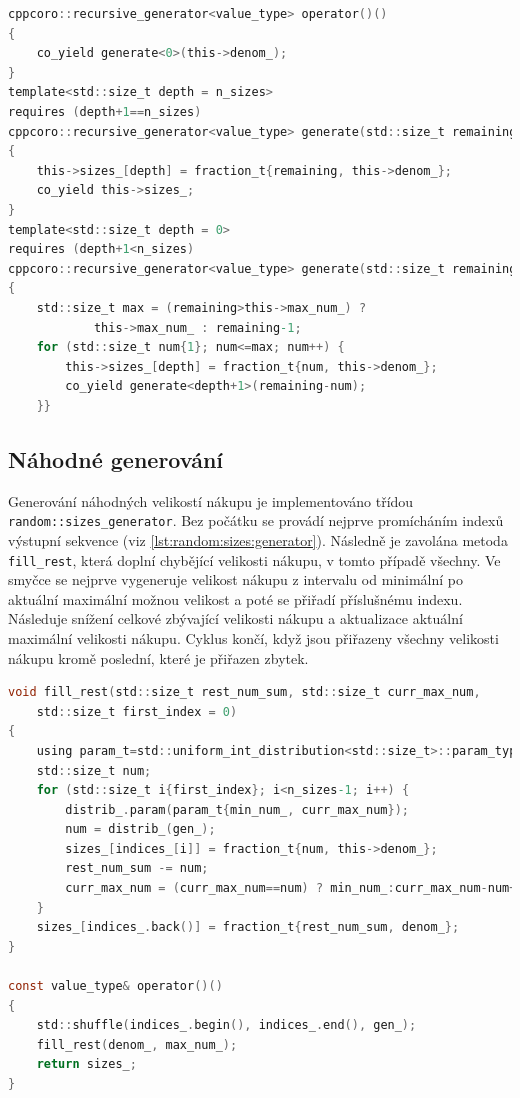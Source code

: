 \begin{lstlisting}[caption={~Metody pro systematické generování velikostí nákupu},label={lst:systematic:sizes_generator},captionpos=t,abovecaptionskip=-\medskipamount,belowcaptionskip=\medskipamount,language=C]
cppcoro::recursive_generator<value_type> operator()()
{
    co_yield generate<0>(this->denom_);
}
template<std::size_t depth = n_sizes>
requires (depth+1==n_sizes)
cppcoro::recursive_generator<value_type> generate(std::size_t remaining)
{
    this->sizes_[depth] = fraction_t{remaining, this->denom_};
    co_yield this->sizes_;
}
template<std::size_t depth = 0>
requires (depth+1<n_sizes)
cppcoro::recursive_generator<value_type> generate(std::size_t remaining)
{
    std::size_t max = (remaining>this->max_num_) ?
            this->max_num_ : remaining-1;
    for (std::size_t num{1}; num<=max; num++) {
        this->sizes_[depth] = fraction_t{num, this->denom_};
        co_yield generate<depth+1>(remaining-num);
    }}
\end{lstlisting}

\subsection{Náhodné generování}
Generování náhodných velikostí nákupu je implementováno třídou \texttt{random::sizes\_generator}.
Bez počátku se provádí nejprve promícháním indexů výstupní sekvence (viz \ref{lst:random:sizes:generator}).
Následně je zavolána metoda \texttt{fill\_rest}, která doplní chybějící velikosti nákupu, v tomto případě všechny.
Ve smyčce se nejprve vygeneruje velikost nákupu z intervalu od minimální po aktuální maximální možnou velikost a poté se přiřadí příslušnému indexu.
Následuje snížení celkové zbývající velikosti nákupu a aktualizace aktuální maximální velikosti nákupu.
Cyklus končí, když jsou přiřazeny všechny velikosti nákupu kromě poslední, které je přiřazen zbytek.

\begin{lstlisting}[caption={~Metody pro náhodné generování velikostí nákupu bez počátku},label={lst:random:sizes:generator},captionpos=t,abovecaptionskip=-\medskipamount,belowcaptionskip=\medskipamount,language=C]
void fill_rest(std::size_t rest_num_sum, std::size_t curr_max_num,
    std::size_t first_index = 0)
{
    using param_t=std::uniform_int_distribution<std::size_t>::param_type;
    std::size_t num;
    for (std::size_t i{first_index}; i<n_sizes-1; i++) {
        distrib_.param(param_t{min_num_, curr_max_num});
        num = distrib_(gen_);
        sizes_[indices_[i]] = fraction_t{num, this->denom_};
        rest_num_sum -= num;
        curr_max_num = (curr_max_num==num) ? min_num_:curr_max_num-num+1;
    }
    sizes_[indices_.back()] = fraction_t{rest_num_sum, denom_};
}

const value_type& operator()()
{
    std::shuffle(indices_.begin(), indices_.end(), gen_);
    fill_rest(denom_, max_num_);
    return sizes_;
}
\end{lstlisting}

